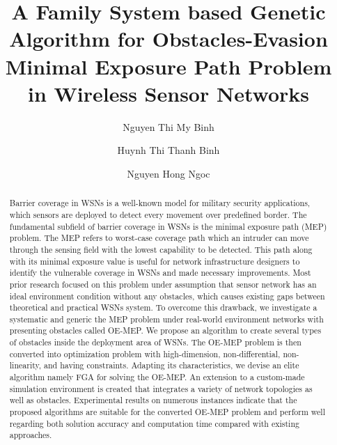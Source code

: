\documentclass[final]{elsarticle}
\begin{document}
\begin{frontmatter}
\title{A Family System based Genetic Algorithm for Obstacles-Evasion Minimal Exposure Path Problem in Wireless Sensor Networks}

\author[ntmb]{Nguyen Thi My Binh}
\author[httb]{Huynh Thi Thanh Binh}
\author[httb]{Nguyen Hong Ngoc}
\address[ntmb]{Hanoi University of Industry, Vietnam}
\address[httb]{ Hanoi University of Science and Technology, Vietnam}

%
%
\begin{abstract}
Barrier coverage in WSNs is a well-known model for military security applications, which sensors are deployed to detect every movement over predefined border. The fundamental subfield of barrier coverage in WSNs is the minimal exposure path (MEP) problem. The MEP refers to worst-case coverage path which an intruder can move through the sensing field with the lowest capability to be detected. This path along with its minimal exposure value is useful for network infrastructure designers to identify the vulnerable coverage in WSNs and made necessary improvements. Most prior research focused on this problem under assumption that sensor network has an ideal environment condition without any obstacles, which causes existing gaps between theoretical and practical WSNs system. To overcome this drawback, we investigate a systematic and generic the MEP problem under real-world environment networks with presenting obstacles called OE-MEP. We propose an algorithm to create several types of obstacles inside the deployment area of WSNs. The OE-MEP problem is then converted into optimization problem with high-dimension, non-differential, non-linearity, and having constraints. Adapting its characteristics, we devise an elite algorithm namely FGA for solving the OE-MEP. An extension to a custom-made simulation environment is created that integrates a variety of network topologies as well as obstacles. Experimental results on numerous instances indicate that the proposed algorithms are suitable for the converted OE-MEP problem and perform well regarding both solution accuracy and computation time compared with existing approaches.
  

\end{abstract}
\end{frontmatter}
\end{document}
